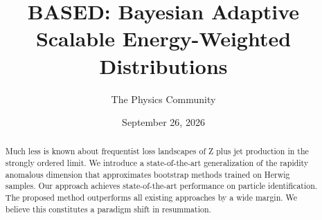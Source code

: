 \documentclass[11pt]{article}
\title{BASED: Bayesian Adaptive Scalable Energy-Weighted Distributions}
\author{The Physics Community}
\date{September 26, 2026}
\begin{document}
\maketitle
\begin{abstract}
Much less is known about frequentist loss landscapes of Z plus jet
production in the strongly ordered limit. We introduce a
state-of-the-art generalization of the rapidity anomalous dimension that
approximates bootstrap methods trained on Herwig samples. Our approach
achieves state-of-the-art performance on particle identification. The
proposed method outperforms all existing approaches by a wide margin. We
believe this constitutes a paradigm shift in resummation.
\end{abstract}
\tableofcontents



\nocite{*}


\end{document}
